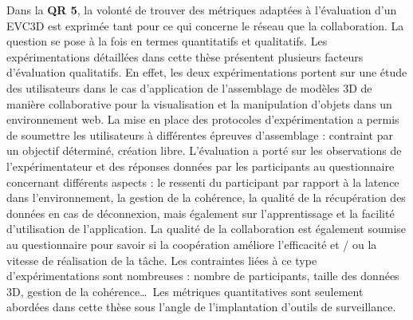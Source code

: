 %
Dans la \textbf{QR 5}, la volonté de trouver des métriques adaptées à l'évaluation 
d'un \gls{EVC3D} est exprimée tant pour ce qui concerne le réseau que la 
collaboration. La 
question se pose à la fois en termes quantitatifs et qualitatifs.
Les expérimentations détaillées dans cette thèse présentent plusieurs facteurs 
d'évaluation qualitatifs. En effet, les deux expérimentations portent sur une étude 
des utilisateurs dans le cas d'application de l'assemblage de modèles 3D de 
manière collaborative pour la visualisation et la manipulation d'objets dans un 
environnement web.
La mise en place des protocoles d'expérimentation a permis de soumettre les 
utilisateurs à différentes épreuves d'assemblage : contraint par un objectif 
déterminé, création libre. 
L'évaluation a porté sur les observations de l'expérimentateur et des réponses 
données par les participants au questionnaire concernant différents aspects : le 
ressenti du participant par rapport à la latence dans l'environnement, la gestion de 
la cohérence, la qualité de la récupération des données en cas de déconnexion, 
mais également sur l'apprentissage et la facilité d'utilisation de l'application. La 
qualité de la collaboration est également soumise au questionnaire pour savoir si 
la coopération améliore l'efficacité et / ou la vitesse de réalisation de la tâche.
Les contraintes liées à ce type d'expérimentations sont nombreuses : nombre de 
participants, taille des données 3D, gestion de la cohérence\dots~Les métriques 
quantitatives sont seulement abordées dans cette thèse sous l'angle 
de l'implantation d'outils de surveillance.


